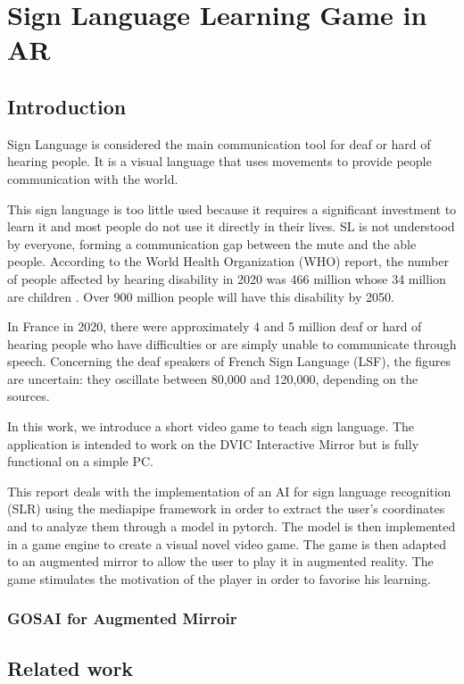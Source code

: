 \chapter{Sign Language Learning Game in AR}

\section{Introduction}

Sign Language is considered the main communication tool for deaf or hard of hearing people. It is a visual language that uses movements to provide people communication with the world. 

This sign language is too little used because it requires a significant investment to learn it and most people do not use it directly in their lives. SL is not understood by everyone, forming a communication gap between the mute and the able people. According to the World Health Organization (WHO) report, the number of people affected by hearing disability in 2020 was 466 million whose 34 million are children \cite{el2020sign}. Over 900 million people will have this disability by 2050.

In France in 2020, there were approximately 4 and 5 million deaf or hard of hearing people who have difficulties or are simply unable to communicate through speech. Concerning the deaf speakers of French Sign Language (LSF), the figures are uncertain: they oscillate between 80,000 and 120,000, depending on the sources.

In this work, we introduce a short video game to teach sign language. The application is intended to work on the DVIC Interactive Mirror but is fully functional on a simple PC.

This report deals with the implementation of an AI for sign language recognition (SLR) using the mediapipe framework in order to extract the user’s coordinates and to analyze them through a model in pytorch. The model is then implemented in a game engine to create a visual novel video game. The game is then adapted to an augmented mirror to allow the user to play it in augmented reality. The game stimulates the motivation of the player in order to favorise his learning.

\subsection{GOSAI for Augmented Mirroir}

\section{Related work}

